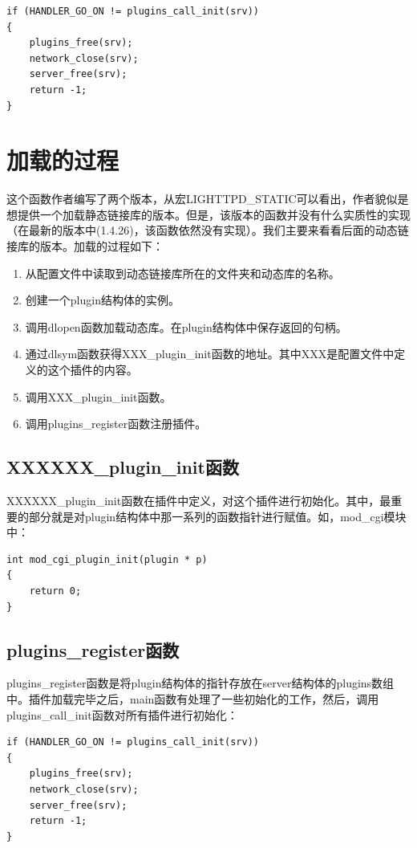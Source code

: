 \documentclass[12pt, dvipdfm]{book}
\begin{document}
\begin{verbatim}
if (HANDLER_GO_ON != plugins_call_init(srv)) 
{
	plugins_free(srv);
	network_close(srv);
	server_free(srv);
	return -1;
}
\end{verbatim}


\section{加载的过程}
这个函数作者编写了两个版本，从宏LIGHTTPD\_STATIC可以看出，作者貌似是想提供一个加载静态链接库的版本。但是，该版本的函数并没有什么实质性的实现（在最新的版本中(1.4.26)，该函数依然没有实现）。我们主要来看看后面的动态链接库的版本。加载的过程如下：
\begin{enumerate}
	\item 从配置文件中读取到动态链接库所在的文件夹和动态库的名称。
	\item 创建一个plugin结构体的实例。
	\item 调用dlopen函数加载动态库。在plugin结构体中保存返回的句柄。
	\item 通过dlsym函数获得XXX\_plugin\_init函数的地址。其中XXX是配置文件中定义的这个插件的内容。
	\item 调用XXX\_plugin\_init函数。
	\item 调用plugins\_register函数注册插件。
\end{enumerate}

\subsection{XXXXXX\_plugin\_init函数}
XXXXXX\_plugin\_init函数在插件中定义，对这个插件进行初始化。其中，最重要的部分就是对plugin结构体中那一系列的函数指针进行赋值。如，mod\_cgi模块中：

\begin{verbatim}
int mod_cgi_plugin_init(plugin * p)
{
	return 0;
}
\end{verbatim}


\subsection{plugins\_register函数}
plugins\_register函数是将plugin结构体的指针存放在server结构体的plugins数组中。插件加载完毕之后，main函数有处理了一些初始化的工作，然后，调用plugins\_call\_init函数对所有插件进行初始化：

\begin{verbatim}
if (HANDLER_GO_ON != plugins_call_init(srv)) 
{
	plugins_free(srv);
	network_close(srv);
	server_free(srv);
	return -1;
}
\end{verbatim}
\end{document}
